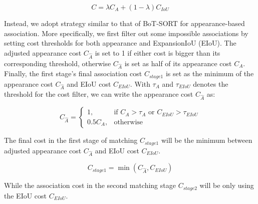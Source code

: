 \documentclass[10pt,twocolumn,letterpaper]{article}
\begin{document}
\begin{equation}
C = \lambda C_A + (1-\lambda) C_{IoU}
\end{equation}

Instead, we adopt strategy similar to that of BoT-SORT \cite{aharon2022bot} for appearance-based association.  More specifically, we first filter out some impossible associations by setting cost thresholds for both appearance and ExpansionIoU (EIoU). The adjusted appearance cost $C_{\hat{A}}$ is set to 1 if either cost is bigger than its corresponding threshold, otherwise $C_{\hat{A}}$ is set as half of its appearance cost $C_A$. Finally, the first stage's final association cost $C_{stage1}$ is set as the minimum of the appearance cost $C_{\hat{A}}$ and EIoU cost $C_{EIoU}$. With $\tau_A$ and $\tau_{EIoU}$ denotes the threshold for the cost filter, we can write the appearance cost $C_{\hat{A}}$ as:

\begin{equation}
C_{\hat{A}} = \begin{cases}
1, & \text{if } C_{A} > \tau_A \text{ or } C_{EIoU} > \tau_{EIoU} \\
0.5 C_{A}, & \text{otherwise}
\end{cases}
\end{equation}


The final cost in the first stage of matching $C_{stage1}$ will be the minimum between adjusted appearance cost $C_{\hat{A}}$ and EIoU cost $C_{EIoU}$. 

\begin{equation}
C_{stage1} = \min(C_{\hat{A}}, C_{EIoU})
\end{equation}

While the association cost in the second matching stage $C_{stage2}$ will be only using the EIoU cost $C_{EIoU}$.
\end{document}
